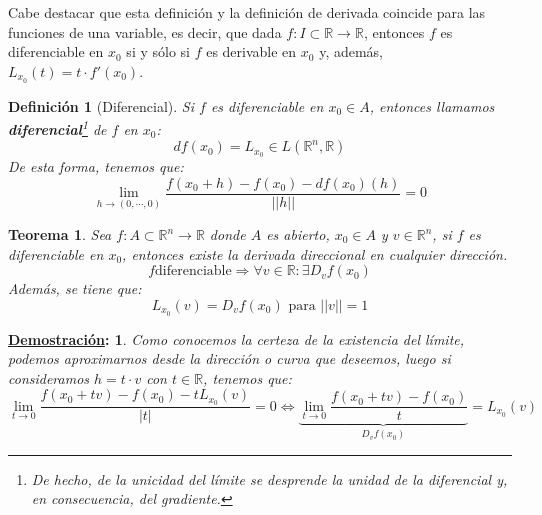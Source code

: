 \documentclass[10pt,a4paper,openright]{book}
\theoremstyle{break}
\newtheorem*{defi}{Definición}
\newtheorem*{theo}{Teorema}
\newtheorem*{demo}{\underline{Demostración}:}
\begin{document}
Cabe destacar que esta definición y la definición de derivada coincide para las funciones de una variable, es decir, que dada $f: I \subset \mathbb{R} \to \mathbb{R}$, entonces $f$ es diferenciable en $x_0$ si y sólo si $f$ es derivable en $x_0$ y, además, $L_{x_0} (t) = t \cdot f'(x_0)$.

\begin{defi}[Diferencial]
Si $f$ es diferenciable en $x_0\in A$, entonces llamamos \textbf{diferencial}\footnote{De hecho, de la unicidad del límite se desprende la unidad de la diferencial y, en consecuencia, del gradiente.} de $f$ en $x_0$:
$$df(x_0) = L_{x_0}\in L(\mathbb{R}^n, \mathbb{R})$$
De esta forma, tenemos que:
$$\lim_{h\rightarrow (0,\cdots, 0)} \frac{f(x_0+h) -f(x_0) -df(x_0)(h)}{||h||} = 0$$
\end{defi}

\begin{theo}
Sea $f: A \subset \mathbb{R}^n \to \mathbb{R}$ donde $A$ es abierto, $x_0 \in A$ y $v \in \mathbb{R}^n$, si $f$ es diferenciable en $x_0$, entonces existe la derivada direccional en cualquier dirección.
$$f \mbox{diferenciable} \Rightarrow \forall v \in \mathbb R: \exists D_vf(x_0)$$
Además, se tiene que:
$$L_{x_0}(v)= D_v f(x_0) \mbox{ para } ||v|| = 1$$
\end{theo}
\begin{demo}
Como conocemos la certeza de la existencia del límite, podemos aproximarnos desde la dirección o curva que deseemos, luego si consideramos $h = t \cdot v$  con $t \in \mathbb{R}$, tenemos que:
$$\lim_{t\rightarrow 0} \frac{f(x_0 + tv) - f(x_0) - tL_{x_0} (v)}{|t|} = 0 \Leftrightarrow  \underbrace{\lim_{t\rightarrow 0} \frac{f(x_0 + tv) - f(x_0)}{t}}_{D_vf(x_0)} = L_{x_0}(v)$$
\end{demo}
\end{document}
